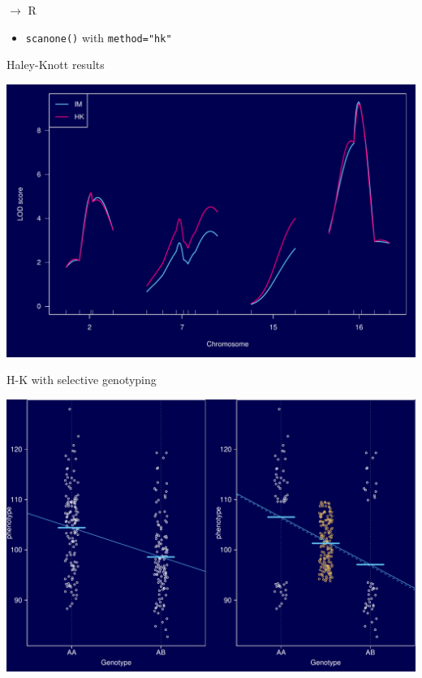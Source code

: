 \documentclass[12pt]{article}
\newcommand{\headsize}{\fontsize{35}{35} \selectfont}
\newcommand{\smallsize}{\fontsize{25}{30} \selectfont}
\begin{document}
\newpage

\headsize \color{myyellow}
$\boldsymbol{\rightarrow}$ R

\vspace{3cm}

\color{mywhite} \smallsize

\hfill \begin{minipage}[t]{9.5in}
\begin{itemize}
\itemsep24pt
\item \verb|scanone()| with \verb|method="hk"|
\end{itemize} \end{minipage}



\newpage

\headsize \color{myyellow}
\hfill \begin{minipage}{5.75in}
\centering
Haley-Knott results
\end{minipage}

\vfill

\centerline{\includegraphics{FigsA/hk_lod.pdf}}



\newpage

\headsize \color{myyellow}
\hfill \begin{minipage}{5.75in}
\centering
H-K with selective genotyping
\end{minipage}

\vfill

\centerline{\includegraphics{FigsA/hk_selgeno.pdf}}
\end{document}
